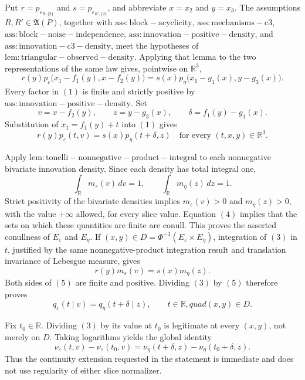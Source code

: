 Put \(r=p_{\varepsilon_{R,\{3\}}}\) and \(s=p_{\varepsilon_{R',\{2\}}}\), and abbreviate \(x=x_2\) and \(y=x_3\).  The assumptions \(R,R'\in\mathfrak A(P)\), together with \(\mathrm{ass:block-acyclicity}\), \(\mathrm{ass:mechanisms-c3}\), \(\mathrm{ass:block-noise-independence}\), \(\mathrm{ass:innovation-positive-density}\), and \(\mathrm{ass:innovation-c3-density}\), meet the hypotheses of \(\mathrm{lem:triangular-observed-density}\).  Applying that lemma to the two representations of the same law gives, pointwise on \(\mathbb R^3\),
\[
 r(y)p_\varepsilon\bigl(x_1-f_1(y),x-f_2(y)\bigr)
 =s(x)p_\eta\bigl(x_1-g_1(x),y-g_3(x)\bigr).
\tag{1}
\]
Every factor in \((1)\) is finite and strictly positive by \(\mathrm{ass:innovation-positive-density}\).  Set
\[
 v=x-f_2(y),\qquad z=y-g_3(x),\qquad
 \delta=f_1(y)-g_1(x).
\tag{2}
\]
Substitution of \(x_1=f_1(y)+t\) into \((1)\) gives
\[
 r(y)p_\varepsilon(t,v)=s(x)p_\eta(t+\delta,z)
 \quad\text{for every }(t,x,y)\in\mathbb R^3.
\tag{3}
\]

Apply \(\mathrm{lem:tonelli-nonnegative-product-integral}\) to each nonnegative bivariate innovation density.  Since each density has total integral one,
\[
 \int_{\mathbb R}m_\varepsilon(v)\,dv=1,
 \qquad
 \int_{\mathbb R}m_\eta(z)\,dz=1.
\tag{4}
\]
Strict positivity of the bivariate densities implies \(m_\varepsilon(v)>0\) and \(m_\eta(z)>0\), with the value \(+\infty\) allowed, for every slice value.  Equation \((4)\) implies that the sets on which these quantities are finite are conull.  This proves the asserted conullness of \(E_\varepsilon\) and \(E_\eta\).  If \((x,y)\in D=\Phi^{-1}(E_\varepsilon\times E_\eta)\), integration of \((3)\) in \(t\), justified by the same nonnegative-product integration result and translation invariance of Lebesgue measure, gives
\[
 r(y)m_\varepsilon(v)=s(x)m_\eta(z).
\tag{5}
\]
Both sides of \((5)\) are finite and positive.  Dividing \((3)\) by \((5)\) therefore proves
\[
 q_\varepsilon(t\mid v)=q_\eta(t+\delta\mid z),
 \qquad t\in\mathbb R,quad (x,y)\in D.
\tag{6}
\]

Fix \(t_0\in\mathbb R\).  Dividing \((3)\) by its value at \(t_0\) is legitimate at every \((x,y)\), not merely on \(D\).  Taking logarithms yields the global identity
\[
 \nu_\varepsilon(t,v)-\nu_\varepsilon(t_0,v)
 =\nu_\eta(t+\delta,z)-\nu_\eta(t_0+\delta,z).
\tag{7}
\]
Thus the continuity extension requested in the statement is immediate and does not use regularity of either slice normalizer.

